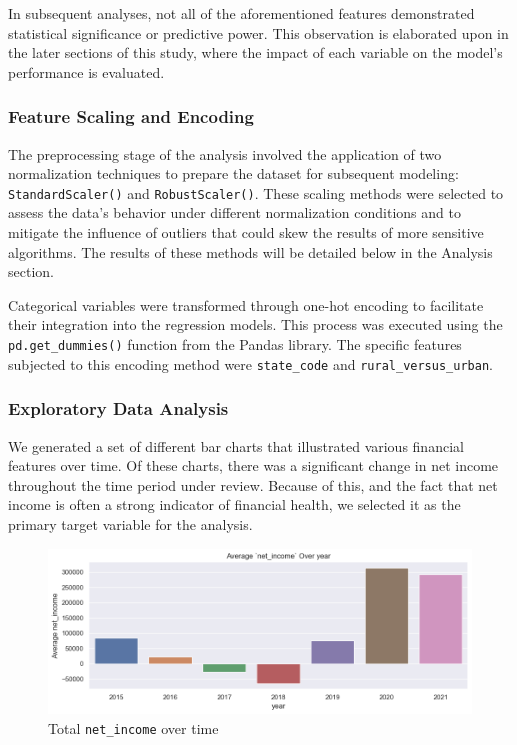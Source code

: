 \documentclass{article}
\theoremstyle{mytheoremstyle}
\theoremstyle{mytheoremstyle}
\theoremstyle{myproblemstyle}
\begin{document}
In subsequent analyses, not all of the aforementioned features demonstrated statistical significance or predictive power. This observation is elaborated upon in the later sections of this study, where the impact of each variable on the model's performance is evaluated.

\subsubsection{Feature Scaling and Encoding}
The preprocessing stage of the analysis involved the application of two normalization techniques to prepare the dataset for subsequent modeling: \texttt{StandardScaler()} and \texttt{RobustScaler()}. These scaling methods were selected to assess the data’s behavior under different normalization conditions and to mitigate the influence of outliers that could skew the results of more sensitive algorithms. The results of these methods will be detailed below in the Analysis section. 

Categorical variables were transformed through one-hot encoding to facilitate their integration into the regression models. This process was executed using the \texttt{pd.get\_dummies()} function from the Pandas library. The specific features subjected to this encoding method were \texttt{state\_code} and \texttt{rural\_versus\_urban}. 


\subsubsection{Exploratory Data Analysis}
We generated a set of different bar charts that illustrated various financial features over time. Of these charts, there was a significant change in net income throughout the time period under review. Because of this, and the fact that net income is often a strong indicator of financial health, we selected it as the primary target variable for the analysis.

\pagebreak
\begin{figure}[htbp]
\centering
\includegraphics[width=\linewidth]{Images/netincome.png}
\caption{Total \texttt{net\_income} over time}
\label{fig:netincome EDA}
\end{figure}
\end{document}
